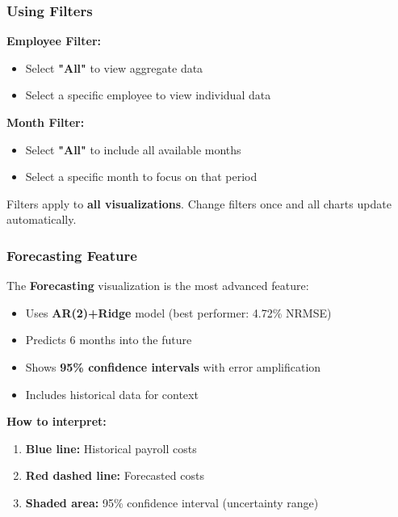 \documentclass[11pt,a4paper]{article}
\begin{document}
\newpage

\subsubsection{Using Filters}

\textbf{Employee Filter:}
\begin{itemize}[leftmargin=*]
    \item Select \textbf{"All"} to view aggregate data
    \item Select a specific employee to view individual data
\end{itemize}

\textbf{Month Filter:}
\begin{itemize}[leftmargin=*]
    \item Select \textbf{"All"} to include all available months
    \item Select a specific month to focus on that period
\end{itemize}

\begin{infobox}[title=Filter Interactions]
Filters apply to \textbf{all visualizations}. Change filters once and all charts update automatically.
\end{infobox}

\subsubsection{Forecasting Feature}

The \textbf{Forecasting} visualization is the most advanced feature:

\begin{itemize}[leftmargin=*]
    \item Uses \textbf{AR(2)+Ridge} model (best performer: 4.72\% NRMSE)
    \item Predicts 6 months into the future
    \item Shows \textbf{95\% confidence intervals} with error amplification
    \item Includes historical data for context
\end{itemize}

\textbf{How to interpret:}
\begin{enumerate}[leftmargin=*]
    \item \textbf{Blue line:} Historical payroll costs
    \item \textbf{Red dashed line:} Forecasted costs
    \item \textbf{Shaded area:} 95\% confidence interval (uncertainty range)
\end{enumerate}
\end{document}
